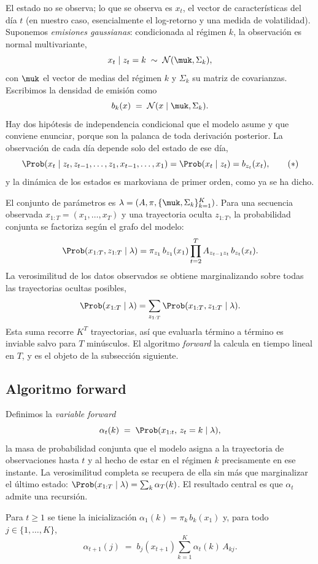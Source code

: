 El estado no se observa; lo que se observa es $x_t$, el vector de características del día $t$ (en nuestro caso, esencialmente el log-retorno y una medida de volatilidad). Suponemos \emph{emisiones gaussianas}: condicionada al régimen $k$, la observación es normal multivariante,
\[
x_t \mid z_t = k \;\sim\; \mathcal{N}(\muk, \Sigma_k),
\]
con $\muk$ el vector de medias del régimen $k$ y $\Sigma_k$ su matriz de covarianzas. Escribimos la densidad de emisión como
\[
b_k(x) \;=\; \mathcal{N}(x \mid \muk, \Sigma_k).
\]
Hay dos hipótesis de independencia condicional que el modelo asume y que conviene enunciar, porque son la palanca de toda derivación posterior. La observación de cada día depende solo del estado de ese día,
\[
\Prob(x_t \mid z_t, z_{t-1}, \dots, z_1, x_{t-1}, \dots, x_1) = \Prob(x_t \mid z_t) = b_{z_t}(x_t),
\tag{$\ast$}
\]
y la dinámica de los estados es markoviana de primer orden, como ya se ha dicho.

El conjunto de parámetros es $\lambda = (A, \pi, \{\muk, \Sigma_k\}_{k=1}^{K})$. Para una secuencia observada $x_{1:T} = (x_1, \dots, x_T)$ y una trayectoria oculta $z_{1:T}$, la probabilidad conjunta se factoriza según el grafo del modelo:
\[
\Prob(x_{1:T}, z_{1:T} \mid \lambda)
= \pi_{z_1}\, b_{z_1}(x_1) \prod_{t=2}^{T} A_{z_{t-1} z_t}\, b_{z_t}(x_t).
\]
La verosimilitud de los datos observados se obtiene marginalizando sobre todas las trayectorias ocultas posibles,
\[
\Prob(x_{1:T} \mid \lambda) = \sum_{z_{1:T}} \Prob(x_{1:T}, z_{1:T} \mid \lambda).
\]
Esta suma recorre $K^T$ trayectorias, así que evaluarla término a término es inviable salvo para $T$ minúsculos. El algoritmo \emph{forward} la calcula en tiempo lineal en $T$, y es el objeto de la subsección siguiente.

\subsection{Algoritmo forward}
\label{sec:hmm-forward}

Definimos la \emph{variable forward}
\[
\alpha_t(k) \;=\; \Prob(x_{1:t},\, z_t = k \mid \lambda),
\]
la masa de probabilidad conjunta que el modelo asigna a la trayectoria de observaciones hasta $t$ y al hecho de estar en el régimen $k$ precisamente en ese instante. La verosimilitud completa se recupera de ella sin más que marginalizar el último estado: $\Prob(x_{1:T} \mid \lambda) = \sum_{k} \alpha_T(k)$. El resultado central es que $\alpha_t$ admite una recursión.

\begin{proposicion}
\label{prop:forward}
Para $t \ge 1$ se tiene la inicialización $\alpha_1(k) = \pi_k\, b_k(x_1)$ y, para todo $j \in \{1, \dots, K\}$,
\[
\alpha_{t+1}(j) \;=\; b_j(x_{t+1}) \sum_{k=1}^{K} \alpha_t(k)\, A_{kj}.
\]
\end{proposicion}


